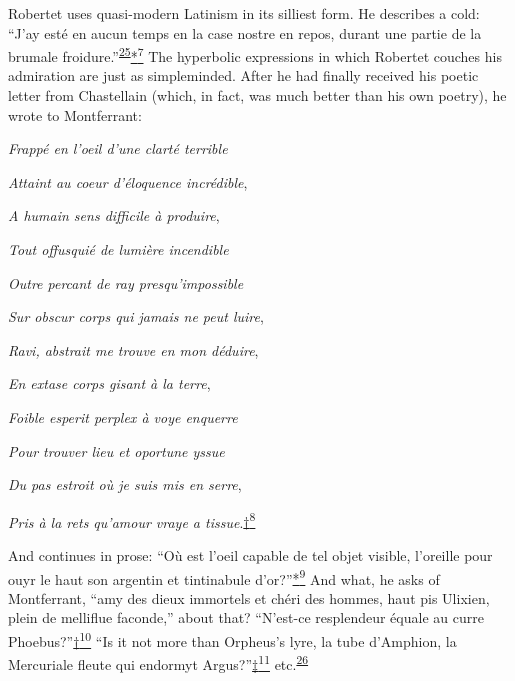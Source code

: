 Robertet uses quasi-modern Latinism in its silliest form. He describes a
cold: ``J'ay esté en aucun temps en la case nostre en repos, durant une
partie de la brumale
froidure.''\textsuperscript{\protect\hypertarget{22_Chapter_Fourteen__THE_COMING_OF.xhtmlux5cux23id_74}{\protect\hyperlink{23_NOTES.xhtmlux5cux23id_75}{25}}}\protect\hypertarget{22_Chapter_Fourteen__THE_COMING_OF.xhtmlux5cux23id_2791}{\protect\hyperlink{23_NOTES.xhtmlux5cux23id_2792}{*\textsuperscript{7}}}
The hyperbolic expressions in which Robertet couches his admiration are
just as simpleminded. After he had finally received his poetic letter
from Chastellain (which, in fact, was much better than his own poetry),
he wrote to Montferrant:

\emph{Frappé en l'oeil d'une clarté terrible}

\emph{Attaint au coeur d'éloquence incrédible},

\emph{A humain sens difficile à produire},

\emph{Tout offusquié de lumière incendible}

\emph{Outre percant de ray presqu'impossible}

\emph{Sur obscur corps qui jamais ne peut luire},

\emph{Ravi, abstrait me trouve en mon déduire},

\emph{En extase corps gisant à la terre},

\emph{Foible esperit perplex à voye enquerre}

\emph{Pour trouver lieu et oportune yssue}

\emph{Du pas estroit où je suis mis en serre},

\emph{Pris à la rets qu'amour vraye a
tissue}.\protect\hypertarget{22_Chapter_Fourteen__THE_COMING_OF.xhtmlux5cux23id_2789}{\protect\hyperlink{23_NOTES.xhtmlux5cux23id_2790}{†\textsuperscript{8}}}

\protect\hypertarget{22_Chapter_Fourteen__THE_COMING_OF.xhtmlux5cux23page_391}{}{}And
continues in prose: ``Où est l'oeil capable de tel objet visible,
l'oreille pour ouyr le haut son argentin et tintinabule
d'or?''\protect\hypertarget{22_Chapter_Fourteen__THE_COMING_OF.xhtmlux5cux23id_2377}{\protect\hyperlink{23_NOTES.xhtmlux5cux23id_2378}{*\textsuperscript{9}}}
And what, he asks of Montferrant, ``amy des dieux immortels et chéri des
hommes, haut pis Ulixien, plein de melliflue faconde,'' about that?
``N'est-ce resplendeur équale au curre
Phoebus?''\protect\hypertarget{22_Chapter_Fourteen__THE_COMING_OF.xhtmlux5cux23id_2380}{\protect\hyperlink{23_NOTES.xhtmlux5cux23id_2379}{†\textsuperscript{10}}}
``Is it not more than Orpheus's lyre, la tube d'Amphion, la Mercuriale
fleute qui endormyt
Argus?''\protect\hypertarget{22_Chapter_Fourteen__THE_COMING_OF.xhtmlux5cux23id_2381}{\protect\hyperlink{23_NOTES.xhtmlux5cux23id_2382}{‡\textsuperscript{11}}}
etc.\textsuperscript{\protect\hypertarget{22_Chapter_Fourteen__THE_COMING_OF.xhtmlux5cux23id_72}{\protect\hyperlink{23_NOTES.xhtmlux5cux23id_73}{26}}}

